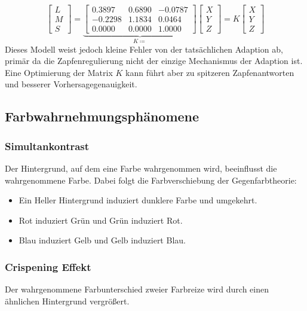 				\begin{equation*}
					\begin{bmatrix}
						L \\
						M \\
						S
					\end{bmatrix}
					=
					\underbrace{
					\begin{bmatrix}
						0.3897  & 0.6890 & -0.0787 \\
						-0.2298 & 1.1834 & 0.0464  \\
						0.0000  & 0.0000 & 1.0000
					\end{bmatrix}
					}_{K \coloneqq}
					\begin{bmatrix}
						X \\
						Y \\
						Z
					\end{bmatrix}
					= K
					\begin{bmatrix}
						X \\
						Y \\
						Z
					\end{bmatrix}
				\end{equation*}
				Dieses Modell weist jedoch kleine Fehler von der tatsächlichen Adaption ab, primär da die Zapfenregulierung nicht der einzige Mechanismus der Adaption ist. Eine Optimierung der Matrix \(K\) kann führt aber zu spitzeren Zapfenantworten und besserer Vorhersagegenauigkeit.

		\subsection{Farbwahrnehmungsphänomene}
			\subsubsection{Simultankontrast}
				Der Hintergrund, auf dem eine Farbe wahrgenommen wird, beeinflusst die wahrgenommene Farbe. Dabei folgt die Farbverschiebung der Gegenfarbtheorie:
				\begin{itemize}
					\item Ein Heller Hintergrund induziert dunklere Farbe und umgekehrt.
					\item Rot induziert Grün und Grün induziert Rot.
					\item Blau induziert Gelb und Gelb induziert Blau.
				\end{itemize}

			\subsubsection{Crispening Effekt}
				Der wahrgenommene Farbunterschied zweier Farbreize wird durch einen ähnlichen Hintergrund vergrößert.

